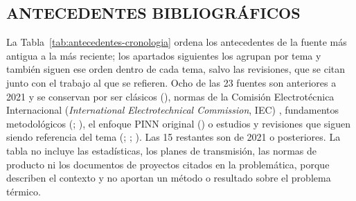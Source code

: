 \subsection{ANTECEDENTES BIBLIOGRÁFICOS}
\label{sec:antecedentes}

La Tabla~\ref{tab:antecedentes-cronologia} ordena los antecedentes de la fuente más antigua a la más reciente; los apartados siguientes los agrupan por tema y también siguen ese orden dentro de cada tema, salvo las revisiones, que se citan junto con el trabajo al que se refieren. Ocho de las 23 fuentes son anteriores a 2021 y se conservan por ser clásicos (\textcite{neher1957}), normas de la Comisión Electrotécnica Internacional (\textit{International Electrotechnical Commission}, IEC) \parencite{iec60853}, fundamentos metodológicos (\textcite{peffers2007}; \textcite{gregor2013}), el enfoque PINN original (\textcite{raissi2019}) o estudios y revisiones que siguen siendo referencia del tema (\textcite{aras2005}; \textcite{oclon2015}; \textcite{enescu2020}). Las 15 restantes son de 2021 o posteriores. La tabla no incluye las estadísticas, los planes de transmisión, las normas de producto ni los documentos de proyectos citados en la problemática, porque describen el contexto y no aportan un método o resultado sobre el problema térmico.

